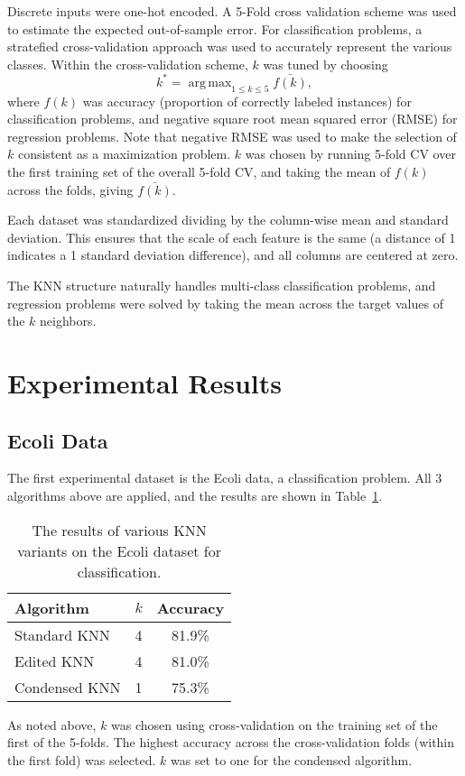 \documentclass{amsart}
\DeclareMathOperator*{\argmax}{arg\,max}
\begin{document}
    Discrete inputs were one-hot encoded. A 5-Fold cross validation scheme was used to estimate the expected out-of-sample
    error. For classification problems, a stratefied cross-validation approach was used to accurately
    represent the various classes. Within the cross-validation scheme, $k$ was tuned by choosing
    \[
        k^* = \argmax_{1 \leq k \leq 5} \bar{f(k)},
    \]
    where $f(k)$ was accuracy (proportion of correctly labeled instances)
    for classification problems, and negative square root mean squared error (RMSE) for regression problems.
    Note that negative RMSE was used to make the selection of $k$ consistent as a maximization problem.
    $k$ was chosen
    by running 5-fold CV over the first training set of the overall 5-fold CV, and taking the mean of $f(k)$ across the
    folds, giving $\bar{f(k)}$.

    Each dataset was standardized dividing by the column-wise mean and standard deviation. This
    ensures that the scale of each feature is the same (a distance of 1 indicates a 1
    standard deviation difference), and all columns are centered at zero.

    The KNN structure naturally handles multi-class classification problems, and regression
    problems were solved by taking the mean across the target values of the $k$ neighbors.

    \section{Experimental Results}
    \subsection*{Ecoli Data}
    The first experimental dataset is the Ecoli data\cite{ecoli_dataset},
    a classification problem. All 3 algorithms above are applied,
    and the results are shown in Table~\ref{ecoli_results}.

    \begin{table}[H]
    \begin{tabular}{lcc}
        Algorithm     & $k$ & Accuracy \\
        \hline
        Standard KNN  & 4 & 81.9\% \\
        Edited KNN    & 4 & 81.0\% \\
        Condensed KNN & 1 & 75.3\% \\
    \end{tabular}
    \label{ecoli_results}
    \caption{The results of various KNN variants on the Ecoli dataset for classification.}
    \end{table}
    As noted above, $k$ was chosen using cross-validation on the training set of the first of the 5-folds. The highest
    accuracy across the cross-validation folds (within the first fold) was selected. $k$ was set to one for the
    condensed algorithm.
\end{document}
